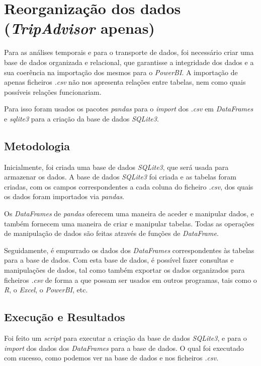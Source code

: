 \chapter{Reorganização dos dados (\textit{TripAdvisor} apenas)}
\label{cap6}


Para as análises temporais e para o transporte de dados, foi necessário criar uma base de dados organizada e relacional, que garantisse a integridade dos dados e a sua coerência na importação dos mesmos para o \textit{PowerBI}. A importação de apenas ficheiros \textit{.csv} não nos apresenta relações entre tabelas, nem como quais possíveis relações funcionariam.

Para isso foram usados os pacotes \textit{pandas} para o \textit{import} dos \textit{.csv} em \textit{DataFrames} e \textit{sqlite3} para a criação da base de dados \textit{SQLite3}.

\section{Metodologia}

Inicialmente, foi criada uma base de dados \textit{SQLite3}, que será usada para armazenar os dados. A base de dados \textit{SQLite3} foi criada e as tabelas foram criadas, com os campos correspondentes a cada coluna do ficheiro \textit{.csv}, dos quais os dados foram importados via \textit{pandas}. 

Os \textit{DataFrames} de \textit{pandas} oferecem uma maneira de aceder e manipular dados, e também fornecem uma maneira de criar e manipular tabelas. Todas as operações de manipulação de dados são feitas através de funções de \textit{DataFrame}.

Seguidamente, é empurrado os dados dos \textit{DataFrames} correspondentes às tabelas para a base de dados. Com esta base de dados, é possível fazer consultas e manipulações de dados, tal como também exportar os dados organizados para ficheiros \textit{.csv} de forma a que possam ser usados em outros programas, tais como o \textit{R}, o \textit{Excel}, o \textit{PowerBI}, etc.

\section{Execução e Resultados}

Foi feito um \textit{script} para executar a criação da base de dados \textit{SQLite3}, e para o \textit{import} dos dados dos \textit{DataFrames} para a base de dados. O qual foi executado com sucesso, como podemos ver na base de dados e nos ficheiros \textit{.csv}.